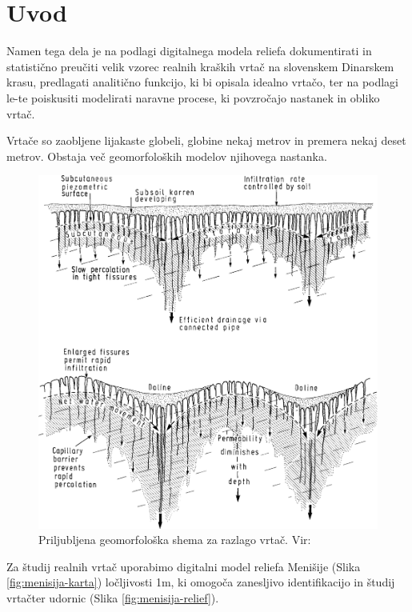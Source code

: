 \documentclass[a4paper, oneside, 12pt]{book}
\begin{document}
\mainmatter
\setcounter{page}{1}
\pagestyle{fancy}

\chapter{Uvod}
\label{ch1}
Namen tega dela je na podlagi digitalnega modela reliefa dokumentirati in statistično preučiti velik vzorec realnih kraških vrtač na slovenskem Dinarskem krasu, predlagati analitično funkcijo, ki bi opisala idealno vrtačo, ter na podlagi le-te poiskusiti modelirati naravne procese, ki povzročajo nastanek in obliko vrtač.

Vrtače so zaobljene lijakaste globeli, globine nekaj metrov in premera nekaj deset metrov. Obstaja več geomorfoloških modelov njihovega nastanka.

\begin{figure}[H]
  \begin{center}
    \includegraphics[width=13cm]{slike/vrtaca-ford-williams}
  \end{center}
  \caption{Priljubljena geomorfološka shema za razlago vrtač. Vir: \cite{ford2007karst}}
  \label{fig:vrtaca-ford-williams}
\end{figure}

Za študij realnih vrtač uporabimo digitalni model reliefa Menišije (Slika \ref{fig:menisija-karta}) ločljivosti 1m, ki omogoča zanesljivo identifikacijo in študij vrtačter udornic (Slika \ref{fig:menisija-relief}).
\end{document}
